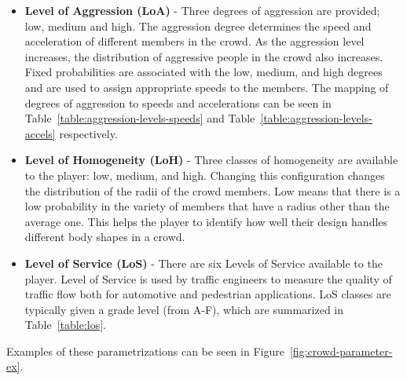 \begin{itemize}

\item \textbf{Level of Aggression (LoA)} - Three degrees of aggression are provided; low, medium and high. The aggression degree determines the speed and acceleration of different members in the crowd. As the aggression level increases, the distribution of aggressive people in the crowd also increases. Fixed probabilities are associated with the low, medium, and high degrees and are used to assign appropriate speeds to the members. The mapping of degrees of aggression to speeds and accelerations can be seen in Table~\ref{table:aggression-levels-speeds} and Table~\ref{table:aggression-levels-accels} respectively.

\item \textbf{Level of Homogeneity (LoH)} - Three classes of homogeneity are available to the player: low, medium, and high. Changing this configuration changes the distribution of the radii of the crowd members.  Low means that there is a low probability in the variety of members that have a radius other than the average one. This helps the player to identify how well their design handles different body shapes in a crowd.

\item \textbf{Level of Service (LoS)} - There are six Levels of Service available to the player. Level of Service is used by traffic engineers to measure the quality of traffic flow both for automotive and pedestrian applications. LoS classes are typically given a grade level (from A-F), which are summarized in Table~\ref{table:los}. 

\end{itemize}

Examples of these parametrizations can be seen in Figure~\ref{fig:crowd-parameter-ex}.

